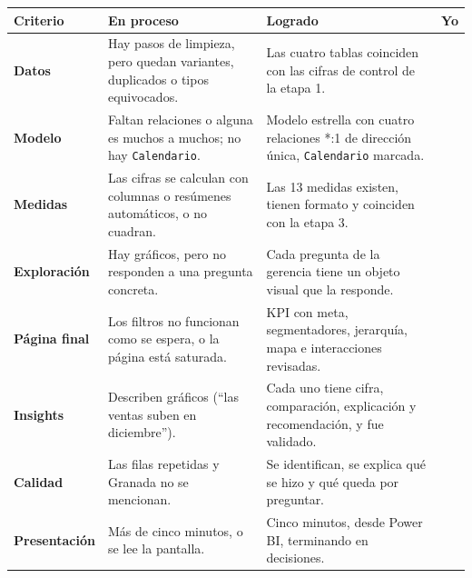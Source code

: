 \documentclass[11pt]{article}
\newcommand{\subtitulo}[1]{\par\needspace{3\baselineskip}\vspace{4pt}{\large\bfseries\color{esumerNavyDark} #1}\par}
\begin{document}
\vspace{2pt}
\small
\renewcommand{\arraystretch}{1.3}
\begin{tabularx}{\textwidth}{@{}>{\raggedright\arraybackslash}p{2.6cm} >{\raggedright\arraybackslash}X >{\raggedright\arraybackslash}X >{\centering\arraybackslash}p{0.9cm}@{}}
\toprule
\textbf{Criterio} & \textbf{En proceso} & \textbf{Logrado} & \textbf{Yo}\\
\midrule
\textbf{Datos} & Hay pasos de limpieza, pero quedan variantes, duplicados o tipos equivocados. & Las cuatro tablas coinciden con las cifras de control de la etapa 1. & \\
\textbf{Modelo} & Faltan relaciones o alguna es muchos a muchos; no hay \texttt{Calendario}. & Modelo estrella con cuatro relaciones *:1 de dirección única, \texttt{Calendario} marcada. & \\
\textbf{Medidas} & Las cifras se calculan con columnas o resúmenes automáticos, o no cuadran. & Las 13 medidas existen, tienen formato y coinciden con la etapa 3. & \\
\textbf{Exploración} & Hay gráficos, pero no responden a una pregunta concreta. & Cada pregunta de la gerencia tiene un objeto visual que la responde. & \\
\textbf{Página final} & Los filtros no funcionan como se espera, o la página está saturada. & KPI con meta, segmentadores, jerarquía, mapa e interacciones revisadas. & \\
\textbf{Insights} & Describen gráficos (``las ventas suben en diciembre''). & Cada uno tiene cifra, comparación, explicación y recomendación, y fue validado. & \\
\textbf{Calidad} & Las filas repetidas y Granada no se mencionan. & Se identifican, se explica qué se hizo y qué queda por preguntar. & \\
\textbf{Presentación} & Más de cinco minutos, o se lee la pantalla. & Cinco minutos, desde Power BI, terminando en decisiones. & \\
\bottomrule
\end{tabularx}
\renewcommand{\arraystretch}{1.0}
\normalsize

\subtitulo{Si algo no cuadra}
\end{document}
